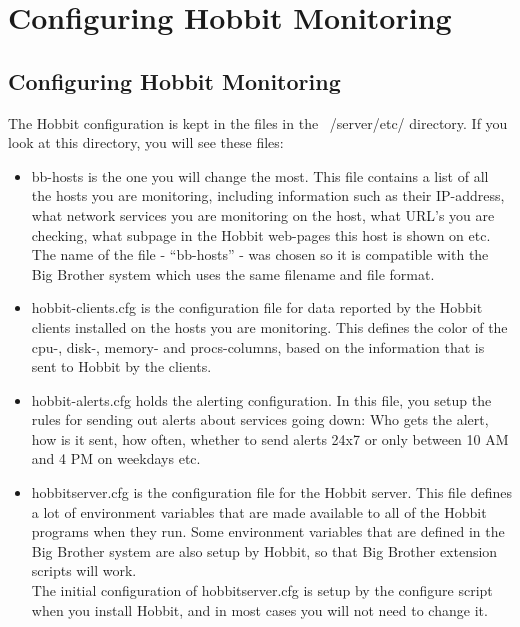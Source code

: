 \chapter{Configuring Hobbit Monitoring}
\label{chap:Configuring}

\section{Configuring Hobbit Monitoring}


The Hobbit configuration is kept in the files in the ~/server/etc/
directory. If you look at this directory, you will see these files:


\begin{itemize}
\item bb-hosts is the one you will change the most. This file contains
  a list of all the hosts you are monitoring, including information
  such as their IP-address, what network services you are monitoring
  on the host, what URL's you are checking, what subpage in the Hobbit
  web-pages this host is shown on etc. The name of the file -
  ``bb-hosts'' - was chosen so it is compatible with the Big Brother
  system which uses the same filename and file format.

\item hobbit-clients.cfg is the configuration file for data reported
  by the Hobbit clients installed on the hosts you are
  monitoring. This defines the color of the cpu-, disk-, memory- and
  procs-columns, based on the information that is sent to Hobbit by
  the clients.

\item hobbit-alerts.cfg holds the alerting configuration. In this
  file, you setup the rules for sending out alerts about services
  going down: Who gets the alert, how is it sent, how often, whether
  to send alerts 24x7 or only between 10 AM and 4 PM on weekdays etc.

\item hobbitserver.cfg is the configuration file for the Hobbit
  server. This file defines a lot of environment variables that are
  made available to all of the Hobbit programs when they run. Some
  environment variables that are defined in the Big Brother system are
  also setup by Hobbit, so that Big Brother extension scripts will
  work.\\ 

The initial configuration of hobbitserver.cfg is setup by the
configure script when you install Hobbit, and in most cases you will
not need to change it.


\end{itemize}
